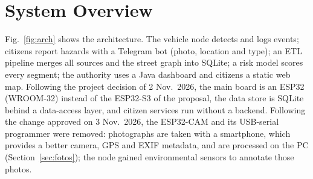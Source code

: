\documentclass[journal,10pt]{IEEEtran}
\begin{document}
\section{System Overview}
Fig.~\ref{fig:arch} shows the architecture. The vehicle node detects and logs events; citizens report hazards with a Telegram bot (photo, location and type); an ETL pipeline merges all sources and the street graph into SQLite; a risk model scores every segment; the authority uses a Java dashboard and citizens a static web map. Following the project decision of 2 Nov.\ 2026, the main board is an ESP32 (WROOM-32) instead of the ESP32-S3 of the proposal, the data store is SQLite behind a data-access layer, and citizen services run without a backend. Following the change approved on 3 Nov.\ 2026, the ESP32-CAM and its USB-serial programmer were removed: photographs are taken with a smartphone, which provides a better camera, GPS and EXIF metadata, and are processed on the PC (Section~\ref{sec:fotos}); the node gained environmental sensors to annotate those photos.
\end{document}
